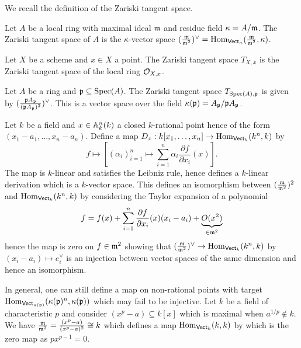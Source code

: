 We recall the definition of the Zariski tangent space. 
\begin{definition}\label{def: Zariski tangent space}
    Let $A$ be a local ring with maximal ideal $\mathfrak{m}$ and residue field $\kappa=A/\mathfrak{m}$. The Zariski tangent space of $A$ is the $\kappa$-vector space $(\frac{\mathfrak{m}}{\mathfrak{m}^{2}})^{\vee}=\mathrm{Hom}_{\mathsf{Vect}_{\kappa}}(\frac{\mathfrak{m}}{\mathfrak{m}^{2}},\kappa)$. 
\end{definition}
\begin{definition}\label{def: Zariski tangent space scheme}
    Let $X$ be a scheme and $x\in X$ a point. The Zariski tangent space $T_{X,x}$ is the Zariski tangent space of the local ring $\mathcal{O}_{X,x}$. 
\end{definition}
\begin{example}\label{ex: spec A example}
    Let $A$ be a ring and $\mathfrak{p}\subseteq\operatorname{Spec}(A)$. The Zariski tangent space $T_{\operatorname{Spec}(A),\mathfrak{p}}$ is given by $(\frac{\mathfrak{p} A_{\mathfrak{p}}}{(\mathfrak{p} A_{\mathfrak{p}})^{2}})^{\vee}$. This is a vector space over the field $\kappa(\mathfrak{p})=A_{\mathfrak{p}}/\mathfrak{p} A_{\mathfrak{p}}$. 
\end{example}
\begin{example}\label{ex: map to hom}
    Let $k$ be a field and $x\in \mathbb{A}^{n}_{k}(k)$ a closed $k$-rational point hence of the form $(x_{1}-a_{1},\dots,x_{n}-a_{n})$. Define a map $D_{x}:k[x_{1},\dots,x_{n}]\to\mathrm{Hom}_{\mathsf{Vect}_{k}}(k^{n},k)$ by $$f\mapsto\left[(\alpha_{i})_{i=1}^{n}\mapsto\sum_{i=1}^{n}\alpha_{i}\frac{\partial f}{\partial x_{i}}(x)\right].$$
    The map is $k$-linear and satisfies the Leibniz rule, hence defines a $k$-linear derivation which is a $k$-vector space. This defines an isomorphism between $(\frac{\mathfrak{m}}{\mathfrak{m}^{2}})^{2}$ and $\mathrm{Hom}_{\mathsf{Vect}_{k}}(k^{n},k)$ by considering the Taylor expansion of a polynomial 
    $$f=f(x)+\sum_{i=1}^{n}\frac{\partial f}{\partial x_{i}}(x)(x_{i}-a_{i})+\underbrace{O(x^{2})}_{\in \mathfrak{m}^{2}}$$
    hence the map is zero on $f\in\mathfrak{m}^{2}$ showing that $(\frac{\mathfrak{m}}{\mathfrak{m}^{2}})^{\vee}\to\mathrm{Hom}_{\mathsf{Vect}_{k}}(k^{n},k)$ by $(x_{i}-a_{i})\mapsto e_{i}^{\vee}$ is an injection between vector spaces of the same dimension and hence an isomorphism. 
\end{example}
\begin{example}
    In general, one can still define a map on non-rational points with target $\mathrm{Hom}_{\mathsf{Vect}_{\kappa(\mathfrak{p})}}(\kappa(\mathfrak{p})^{n},\kappa(\mathfrak{p}))$ which may fail to be injective. Let $k$ be a field of characteristic $p$ and consider $(x^{p}-a)\subseteq k[x]$ which is maximal when $a^{1/p}\notin k$. We have $\frac{\mathfrak{m}}{\mathfrak{m}^{2}}=\frac{(x^{p}-a)}{(x^{p}-a)^{2}}\cong k$ which defines a map $\mathrm{Hom}_{\mathsf{Vect}_{k}}(k,k)$ by  which is the zero map as $px^{p-1}=0$. 
\end{example}
